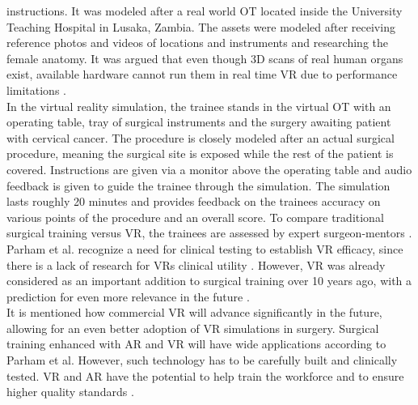 instructions. It was modeled after a real world OT located inside the University Teaching
Hospital in Lusaka, Zambia. The assets were modeled after receiving reference photos
and videos of locations and instruments and researching the female anatomy. It was
argued that even though 3D scans of real human organs exist, available hardware cannot
run them in real time VR due to performance limitations \cite{Parham.2019}.
\\ In the virtual reality simulation, the trainee stands in the virtual OT with an operating
table, tray of surgical instruments and the surgery awaiting patient with cervical cancer.
The procedure is closely modeled after an actual surgical procedure, meaning the surgical
site is exposed while the rest of the patient is covered. Instructions are given via a
monitor above the operating table and audio feedback is given to guide the trainee
through the simulation. The simulation lasts roughly 20 minutes and provides feedback
on the trainees accuracy on various points of the procedure and an overall score. To
compare traditional surgical training versus VR, the trainees are assessed by expert
surgeon-mentors \cite{Parham.2019}.
\\ Parham et al. recognize a need for clinical testing to establish VR efficacy, since there is
a lack of research for VRs clinical utility \cite{RN59}. However, VR was already considered as 
an important addition to surgical training over 10 years ago, with a prediction for even
more relevance in the future \cite{RN60}.
\\ It is mentioned how commercial VR will advance significantly in the future, allowing
for an even better adoption of VR simulations in surgery. Surgical training enhanced
with AR and VR will have wide applications according to Parham et
al. However, such technology has to be carefully built and clinically tested. VR and
AR have the potential to help train the workforce and to ensure higher quality standards
\cite{Parham.2019}.


